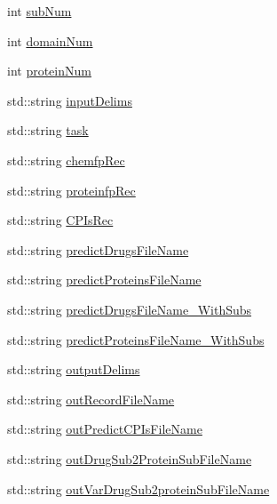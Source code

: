 \begin{DoxyCompactItemize}
int \hyperlink{classgift_1_1parameters_a3736b9054e162bc4bf63d018744ff0c3}{sub\+Num}
\item 
int \hyperlink{classgift_1_1parameters_ae968d9a2aeb5742488810b3f7aa8b098}{domain\+Num}
\item 
int \hyperlink{classgift_1_1parameters_a0a91cd09e0a7f8a7f52e8aca1a832140}{protein\+Num}
\item 
std\+::string \hyperlink{classgift_1_1parameters_a35680722bd40ee2cb5434ca7736e9bac}{input\+Delims}
\item 
std\+::string \hyperlink{classgift_1_1parameters_a59c1e1b83354be0dcc511743c4fe0cc1}{task}
\item 
std\+::string \hyperlink{classgift_1_1parameters_a87d9659a5c46d7075e8a795b51b7ce82}{chemfp\+Rec}
\item 
std\+::string \hyperlink{classgift_1_1parameters_a97ed4f530fac84c7c981f4c4056dc1b1}{proteinfp\+Rec}
\item 
std\+::string \hyperlink{classgift_1_1parameters_a214614b3b837bf7755802764d2ce04c1}{C\+P\+Is\+Rec}
\item 
std\+::string \hyperlink{classgift_1_1parameters_ac19aca119982c0f318958d6d5744bec0}{predict\+Drugs\+File\+Name}
\item 
std\+::string \hyperlink{classgift_1_1parameters_aaefcd06c42b5ddd57400b70cae95858d}{predict\+Proteins\+File\+Name}
\item 
std\+::string \hyperlink{classgift_1_1parameters_ad28f2340e58e3f081edd6541fac12e10}{predict\+Drugs\+File\+Name\+\_\+\+With\+Subs}
\item 
std\+::string \hyperlink{classgift_1_1parameters_a2da7792363c911382a3141486b0a618b}{predict\+Proteins\+File\+Name\+\_\+\+With\+Subs}
\item 
std\+::string \hyperlink{classgift_1_1parameters_a09d714bc1b27aabafe0a8d3e688049ba}{output\+Delims}
\item 
std\+::string \hyperlink{classgift_1_1parameters_ae7ff6109cb437b1375466fb7dc6f1343}{out\+Record\+File\+Name}
\item 
std\+::string \hyperlink{classgift_1_1parameters_a442c2f11e4ce40f1ab51174a7d2408c1}{out\+Predict\+C\+P\+Is\+File\+Name}
\item 
std\+::string \hyperlink{classgift_1_1parameters_a5e40e69f82af3c62071f391d0c932fe6}{out\+Drug\+Sub2\+Protein\+Sub\+File\+Name}
\item 
std\+::string \hyperlink{classgift_1_1parameters_a1d5bd85d510a847e22e47e2bdebebf39}{out\+Var\+Drug\+Sub2protein\+Sub\+File\+Name}
\end{DoxyCompactItemize}


